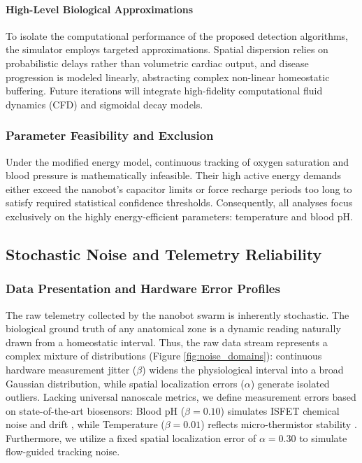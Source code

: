 \documentclass[sigconf]{acmart}
\begin{document}
\paragraph{High-Level Biological Approximations} To isolate the computational performance of the proposed detection algorithms, the simulator employs targeted approximations. Spatial dispersion relies on probabilistic delays rather than volumetric cardiac output, and disease progression is modeled linearly, abstracting complex non-linear homeostatic buffering. Future iterations will integrate high-fidelity computational fluid dynamics (CFD) and sigmoidal decay models.

\subsubsection{Parameter Feasibility and Exclusion}
Under the modified energy model, continuous tracking of oxygen saturation and blood pressure is mathematically infeasible. Their high active energy demands either exceed the nanobot's capacitor limits or force recharge periods too long to satisfy required statistical confidence thresholds. Consequently, all analyses focus exclusively on the highly energy-efficient parameters: temperature and blood pH.

\subsection{Stochastic Noise and Telemetry Reliability}

\subsubsection{Data Presentation and Hardware Error Profiles} 
The raw telemetry collected by the nanobot swarm is inherently stochastic. The biological ground truth of any anatomical zone is a dynamic reading naturally drawn from a homeostatic interval. Thus, the raw data stream represents a complex mixture of distributions (Figure \ref{fig:noise_domains}): continuous hardware measurement jitter ($\beta$) widens the physiological interval into a broad Gaussian distribution, while spatial localization errors ($\alpha$) generate isolated outliers. Lacking universal nanoscale metrics, we define measurement errors based on state-of-the-art biosensors: Blood pH ($\beta = 0.10$) simulates ISFET chemical noise and drift \cite{moser2016isfets}, while Temperature ($\beta = 0.01$) reflects micro-thermistor stability \cite{jayaram2024cmos}. Furthermore, we utilize a fixed spatial localization error of $\alpha = 0.30$ to simulate flow-guided tracking noise.
\end{document}
